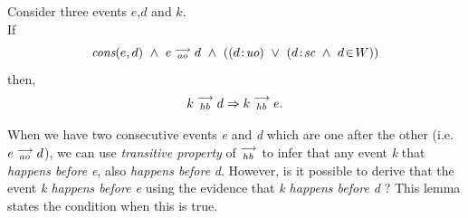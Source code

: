 
\begin{lemma} 
    \label{Lemma1}
    Consider three events $e$,$d$ and $k$. \\

    If
        \[
            \cons{e}{d} \ \wedge \ \reln{e}{ao}{d} \ \wedge \
            (
                (\et{d}{uo}) \ \vee \
                (\et{d}{sc} \ \wedge \ \event{d}{W})
            )
        \]        
    then,
        \[
            k\stackrel{\longrightarrow}{_{hb}}d \Rightarrow k\stackrel{\longrightarrow}{_{hb}}e.
        \]
      
    When we have two consecutive events \textit{e} and \textit{d} which are one after the other (i.e. $e\stackrel{\longrightarrow}{_{ao}}d$), we can use \textit{transitive property} of $\stackrel{\longrightarrow}{_{hb}}$ to infer that any event \textit{k} that \textit{happens before} \textit{e}, also \textit{happens before} \textit{d}. 
    However, is it possible to derive that the event \textit{k happens before e} using the evidence that \textit{k happens before d} ? This lemma states the condition when this is true.
    
\end{lemma}


